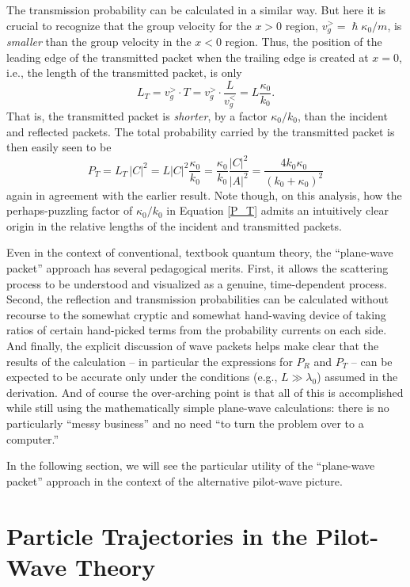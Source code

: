 \documentclass[aps,prc,onecolumn,letterpaper,floatfix,12pt]{revtex4}
\renewcommand{\hbar}{\hslash}
\begin{document}
The transmission probability
can be calculated in a similar way.  But here it is crucial to recognize
that the group velocity for the $x>0$ region, $v_g^> = \hbar \kappa_0
/ m$, is \emph{smaller} than the group velocity in the $x<0$ region.
Thus, the position of the leading edge of the transmitted packet when
the trailing edge is created at $x=0$, i.e., the length of the
transmitted packet, is only
\begin{equation}
L_T = v_g^> \cdot T = v_g^> \cdot \frac{L}{v_g^<} = L \frac{\kappa_0}{k_0}.
\end{equation}
That is, the transmitted packet is \emph{shorter}, by a factor
$\kappa_0/k_0$, than the incident and reflected packets.  The total
probability carried by the transmitted packet is then easily seen to
be
\begin{equation}
P_T = L_T \, |C|^2 = L |C|^2 \frac{\kappa_0}{k_0} =
\frac{\kappa_0}{k_0} \frac{|C|^2}{|A|^2} =
\frac{4 k_0
  \kappa_0}{(k_0+\kappa_0)^2}
\end{equation}
again in agreement with the earlier result.  Note though, on this
analysis, how the perhaps-puzzling factor of $\kappa_0 / k_0$ in
Equation \eqref{P_T} admits an intuitively clear origin in the relative
lengths of the incident and transmitted packets.  

Even in the context of conventional, textbook quantum theory, the
``plane-wave packet'' approach has several pedagogical merits.  First,
it allows the scattering process to be understood and visualized as a 
genuine, time-dependent process.  Second, the reflection and
transmission probabilities can be calculated without recourse to the
somewhat cryptic and somewhat hand-waving device of taking ratios of
certain hand-picked terms from the probability currents on each side.
And finally, the explicit discussion of wave packets helps make clear
that the results of the calculation -- in particular the expressions
for $P_R$ and $P_T$ -- can be expected to be accurate only under the
conditions (e.g., $L \gg \lambda_0$) assumed in the derivation.  And
of course the over-arching point is that all of this is accomplished
while still using the mathematically simple plane-wave calculations:
there is no particularly ``messy business'' and no need ``to turn
the problem over to a computer.''

In the following section, we will see the particular utility of the
``plane-wave packet'' approach in the context of the alternative pilot-wave
picture.

\section{Particle Trajectories in the Pilot-Wave Theory}
\end{document}
